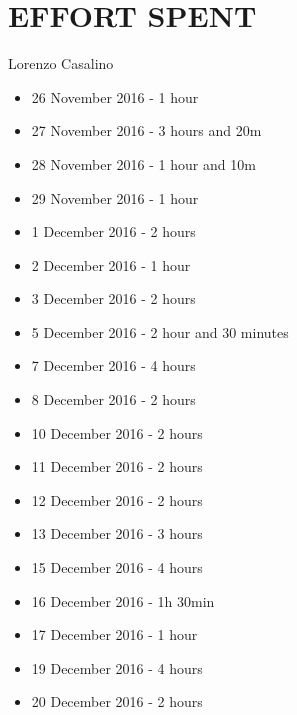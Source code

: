 \section{EFFORT SPENT}

	Lorenzo Casalino

	\begin{itemize}
		\item 26 November 2016 - 1 hour
		\item 27 November 2016 - 3 hours and 20m
		\item 28 November 2016 - 1 hour and 10m
		\item 29 November 2016 - 1 hour
		\item 1  December 2016 - 2 hours
		\item 2  December 2016 - 1 hour
		\item 3  December 2016 - 2 hours
		\item 5  December 2016 - 2 hour and 30 minutes
		\item 7  December 2016 - 4 hours
		\item 8  December 2016 - 2 hours
		\item 10 December 2016 - 2 hours
		\item 11 December 2016 - 2 hours
		\item 12 December 2016 - 2 hours
		\item 13 December 2016 - 3 hours
		\item 15 December 2016 - 4 hours
		\item 16 December 2016 - 1h 30min
		\item 17 December 2016 - 1 hour
		\item 19 December 2016 - 4 hours
		\item 20 December 2016 - 2 hours
	\end{itemize}
